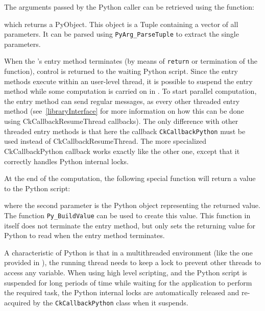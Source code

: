 The arguments passed by the Python caller can be retrieved using the function:


which returns a PyObject. This object is a Tuple containing a vector of all
parameters. It can be parsed using \texttt{PyArg\_ParseTuple} to extract the
single parameters.

When the \charmpp's entry method terminates (by means of \texttt{return} or
termination of the function), control is returned to the waiting Python script.
Since the  entry methods execute within an user-level thread, it is
possible to suspend the entry method while some computation is carried on in
\charmpp. To start parallel computation, the entry method can send regular messages,
as every other threaded entry method (see~\ref{libraryInterface} for more
information on how this can be done using CkCallbackResumeThread callbacks). The
only difference with other threaded entry methods is that here the callback
\texttt{CkCallbackPython} must be used instead of CkCallbackResumeThread. The
more specialized CkCallbackPython callback works exactly like the other one,
except that it correctly handles Python internal locks.

At the end of the computation, the following special function will return a value to the Python script:


where the second parameter is the Python object representing the returned value.
The function \texttt{Py\_BuildValue} can be used to create this value. This
function in itself does not terminate the entry method, but only sets the
returning value for Python to read when the entry method terminates.

A characteristic of Python is that in a multithreaded environment (like the one
provided in \charmpp{}), the running thread needs to keep a lock to prevent
other threads to access any variable. When using high level scripting, and the
Python script is suspended for long periods of time while waiting for the
\charmpp{} application to perform the required task, the Python internal locks
are automatically released and re-acquired by the \texttt{CkCallbackPython}
class when it suspends.

